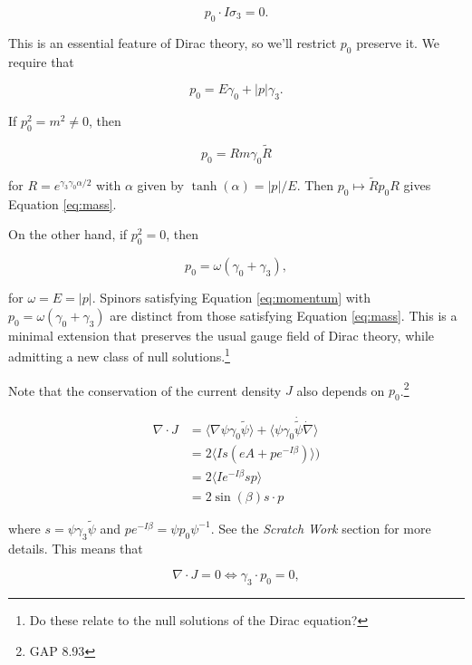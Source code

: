 \documentclass{article}
\begin{document}
  \begin{equation}
    p_0 \cdot I\sigma_3 = 0.
  \end{equation} 

  This is an essential feature of Dirac theory, so we'll restrict $p_0$ preserve it. We require that

  \begin{equation}
    p_0 = E \gamma_0 + |p| \gamma_3.
  \end{equation} 

  If $p_0^2 = m^2 \not= 0$, then 

  \begin{equation}
    p_0 = R m \gamma_0 \widetilde R
  \end{equation} 

  for $R = e^{\gamma_3 \gamma_0 \alpha/2}$ with $\alpha$ given by $\tanh(\alpha) = |p|/E$. Then $p_0 \mapsto \widetilde R p_0 R$ gives Equation \ref{eq:mass}.

  On the other hand, if $p_0^2 = 0$, then

  \begin{equation}
    p_0 = \omega (\gamma_0 + \gamma_3), \label{eq:massless}
  \end{equation}

  for $\omega = E = |p|$. Spinors satisfying Equation \ref{eq:momentum} with $p_0 = \omega(\gamma_0 + \gamma_3)$ are distinct from those satisfying Equation \ref{eq:mass}. This is a minimal extension that preserves the usual gauge field of Dirac theory, while admitting a new class of null solutions.\footnote{Do these relate to the null solutions of the Dirac equation?}

  Note that the conservation of the current density $J$ also depends on $p_0$.\footnote{GAP 8.93}

  \begin{align}
    \nabla \cdot J &= \langle \nabla \psi \gamma_0 \widetilde \psi \rangle + \langle \psi \gamma_0 \dot{\widetilde{\psi}} \dot \nabla \rangle\\
    &= 2 \langle I s (e A + p e^{-I \beta}) \rangle) \\
    &= 2 \langle I e^{-I \beta} s p \rangle \\
    &= 2 \sin(\beta) s \cdot p
  \end{align}

  where $s = \psi \gamma_3 \widetilde \psi$ and $p e^{-I\beta} = \psi p_0 \psi^{-1}$. See the \emph{Scratch Work} section for more details. This means that 

  \begin{equation}
    \nabla \cdot J = 0 \iff \gamma_3 \cdot p_0 = 0,
  \end{equation} 
\end{document}
